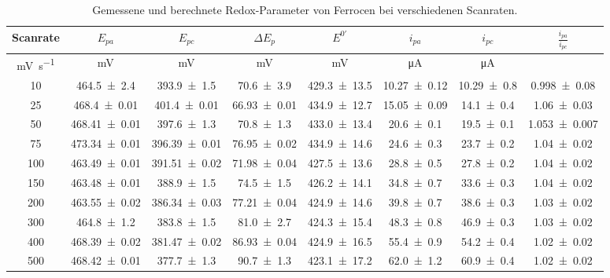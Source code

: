 \begin{table}[H]
    \begin{adjustwidth}{-2.2cm}{-1cm}
    \setlength{\tabcolsep}{4pt}
    \centering
    \caption{Gemessene und berechnete Redox-Parameter von Ferrocen bei verschiedenen Scanraten.}
    \begin{tabular}{c c c c c c c c}
        \toprule
        Scanrate & $E_{pa}$ & $E_{pc}$ & $\Delta E_p$ & $E^{0'}$ & $i_{pa}$ & $i_{pc}$ & $\frac{i_{pa}}{i_{pc}}$ \\ \midrule
        \unit{\milli\volt\per\second} & \unit{\milli\volt} & \unit{\milli\volt} & \unit{\milli\volt} & \unit{\milli\volt} & \unit{\micro\ampere} & \unit{\micro\ampere} & \\ \midrule
        10 & \num{464.5 +- 2.4} & \num{393.9 +- 1.5} & \num{70.6 +- 3.9} & \num{429.3 +- 13.5} & \num{10.27 +- 0.12} & \num{10.29 +- 0.8} & \num{0.998 +- 0.08} \\ \midrule
        25 & \num{468.4 +- 0.01} & \num{401.4 +- 0.01} & \num{66.93 +- 0.01} & \num{434.9 +- 12.7} & \num{15.05 +- 0.09} & \num{14.1 +- 0.4} & \num{1.06 +- 0.03} \\ \midrule
        50 & \num{468.41 +- 0.01} & \num{397.6 +- 1.3} & \num{70.8 +- 1.3} & \num{433.0 +- 13.4} & \num{20.6 +- 0.1} & \num{19.5 +- 0.1} & \num{1.053 +- 0.007} \\ \midrule
        75 & \num{473.34 +- 0.01} & \num{396.39 +- 0.01} & \num{76.95 +- 0.02} & \num{434.9 +- 14.6} & \num{24.6 +- 0.3} & \num{23.7 +- 0.2} & \num{1.04 +- 0.02} \\ \midrule
        100 & \num{463.49 +- 0.01} & \num{391.51 +- 0.02} & \num{71.98 +- 0.04} & \num{427.5 +- 13.6} & \num{28.8 +- 0.5} & \num{27.8 +- 0.2} & \num{1.04 +- 0.02} \\ \midrule
        150 & \num{463.48 +- 0.01} & \num{388.9 +- 1.5} & \num{74.5 +- 1.5} & \num{426.2 +- 14.1} & \num{34.8 +- 0.7} & \num{33.6 +- 0.3} & \num{1.04 +- 0.02} \\ \midrule
        200 & \num{463.55 +- 0.02} & \num{386.34 +- 0.03} & \num{77.21 +- 0.04} & \num{424.9 +- 14.6} & \num{39.8 +- 0.7} & \num{38.6 +- 0.3} & \num{1.03 +- 0.02} \\ \midrule
        300 & \num{464.8 +- 1.2} & \num{383.8 +- 1.5} & \num{81.0 +- 2.7} & \num{424.3 +- 15.4} & \num{48.3 +- 0.8} & \num{46.9 +- 0.3} & \num{1.03 +- 0.02} \\ \midrule
        400 & \num{468.39 +- 0.02} & \num{381.47 +- 0.02} & \num{86.93 +- 0.04} & \num{424.9 +- 16.5} & \num{55.4 +- 0.9} & \num{54.2 +- 0.4} & \num{1.02 +- 0.02} \\ \midrule
        500 & \num{468.42 +- 0.01} & \num{377.7 +- 1.3} & \num{90.7 +- 1.3} & \num{423.1 +- 17.2} & \num{62.0 +- 1.2} & \num{60.9 +- 0.4} & \num{1.02 +- 0.02} \\
        \bottomrule
    \end{tabular}
    \label{tab:redox_parameters}
    \setlength{\tabcolsep}{6pt}
    \end{adjustwidth}
\end{table}
